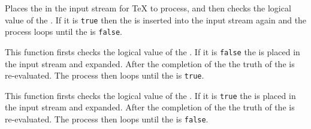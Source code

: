 \documentclass[oneside]{book}
\begin{document}
\begin{function}{\BoolVarDoWhile}
\begin{syntax}
  
\end{syntax}
Places the  in the input stream for \TeX{} to process,
and then checks the logical value of the .  If it is
\texttt{true} then the  is inserted into the input
stream again and the process loops until the  is
\texttt{false}.
\begin{demohigh}
\IgnoreSpacesOn
\BoolSetTrue \lTmpaBool
\IntZero \lTmpaInt
\ClistClear \lTmpaClist
\BoolVarDoWhile {}
\ClistVarJoin \lTmpaClist {:}
\IgnoreSpacesOff
\end{demohigh}
\end{function}

\begin{function}{\BoolVarUntilDo}
\begin{syntax}
  
\end{syntax}
This function firsts checks the logical value of the .
If it is \texttt{false} the  is placed in the input stream
and expanded. After the completion of the  the truth
of the  is re-evaluated. The process then loops
until the  is \texttt{true}.
\begin{demohigh}
\IgnoreSpacesOn
\BoolSetFalse \lTmpaBool
\IntZero \lTmpaInt
\ClistClear \lTmpaClist
\BoolVarUntilDo {}
\ClistVarJoin \lTmpaClist {:}
\IgnoreSpacesOff
\end{demohigh}
\end{function}

\begin{function}{\BoolVarWhileDo}
\begin{syntax}
  
\end{syntax}
This function firsts checks the logical value of the .
If it is \texttt{true} the  is placed in the input stream
and expanded. After the completion of the  the truth
of the  is re-evaluated. The process then loops
until the  is \texttt{false}.
\begin{demohigh}
\IgnoreSpacesOn
\BoolSetTrue \lTmpaBool
\IntZero \lTmpaInt
\ClistClear \lTmpaClist
\BoolVarWhileDo {}
\ClistVarJoin \lTmpaClist {:}
\IgnoreSpacesOff
\end{demohigh}
\end{function}
\end{document}

